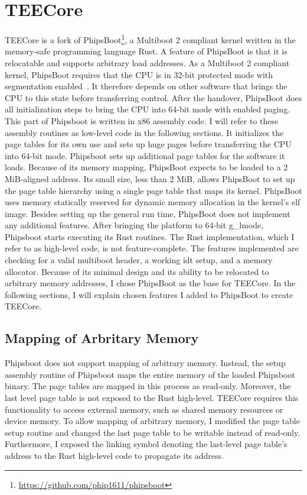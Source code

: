 \section{TEECore}
\label{sec:implementation:teeKernel}
TEECore is a fork of
PhipsBoot\footnote{\url{https://github.com/phip1611/phipsboot}}, a Multiboot 2
compliant kernel written in the memory-safe programming language Rust. A feature
of PhipsBoot is that it is relocatable and supports arbitrary load addresses. As
a Multiboot 2 compliant kernel, PhipsBoot requires that the CPU is in 32-bit
protected mode with segmentation enabled~\cite{mb2}. It therefore depends on
other software that brings the CPU to this state before transferring control.
After the handover, PhipsBoot does all initialization steps to bring the CPU
into 64-bit mode with enabled paging. This part of Phipsboot is written in x86
assembly code. I will refer to these assembly routines as low-level code in the
following sections. It initializes the page tables for its own use and sets up
huge pages before transferring the CPU into 64-bit mode. Phipsboot sets up
additional page tables for the software it loads. Because of its memory mapping,
PhipsBoot expects to be loaded to a 2 MiB-aligned address. Its small size, less
than 2 MiB, allows PhipsBoot to set up the page table hierarchy using a single
page table that maps its kernel. PhipsBoot uses memory statically reserved for
dynamic memory allocation in the kernel's \gls{elf} image. Besides setting up
the general run time, PhipsBoot does not implement any additional features.
After bringing the platform to 64-bit \gls{g_lmode}, Phipsboot starts executing
its Rust routines. The Rust implementation, which I refer to as high-level code,
is not feature-complete. The features implemented are checking for a valid
multiboot header, a working \gls{idt} setup, and a memory allocator. Because of
its minimal design and its ability to be relocated to arbitrary memory
addresses, I chose PhipsBoot as the base for TEECore. In the following sections,
I will explain chosen features I added to PhipsBoot to create TEECore.\\

\subsection{Mapping of Arbritary Memory}
\label{sec:implementation:teeKernel:mem}
Phipsboot does not support mapping of arbitrary memory. Instead, the setup
assembly routine of Phipsboot maps the entire memory of the loaded Phipsboot
binary. The page tables are mapped in this process as read-only. Moreover, the
last level page table is not exposed to the Rust high-level. TEECore requires
this functionality to access external memory, such as shared memory resources or
device memory. To allow mapping of arbitrary memory, I modified the page table
setup routine and changed the last page table to be writable instead of
read-only. Furthermore, I exposed the linking symbol denoting the last-level
page table's address to the Rust high-level code to propagate its address.\\

